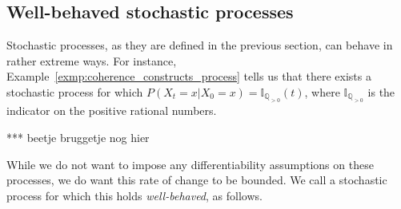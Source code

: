 \documentclass[10pt,a4paper]{paper}
\theoremstyle{definition}
\newtheorem{proposition}[theorem]{Proposition}
\newcommand{\reals}{\mathbb{R}}
\newcommand{\realsnonneg}{\reals_{\geq 0}}
\newcommand{\states}{\mathcal{X}}
\newcommand{\paths}{\Omega}
\newcommand{\power}{\mathcal{P}(\paths)}
\newcommand{\nonemptypower}{\power_{\emptyset}}
\newcommand{\processes}{\mathbb{P}}
\newcommand{\ind}[1]{\mathbb{I}_{#1}}
\newcommand{\coloneqq}{:\!=}
\begin{document}
%
%
%

\subsection{Well-behaved stochastic processes}\label{sec:well_behaved}

Stochastic processes, as they are defined in the previous section, can behave in rather extreme ways. For instance, Example~\ref{exmp:coherence_constructs_process} tells us that there exists a stochastic process for which $P(X_t=x\vert X_0=x)=\ind{\mathbb{Q}_{>0}}(t)$, where $\ind{\mathbb{Q}_{>0}}$ is the indicator on the positive rational numbers. 

*** beetje bruggetje nog hier

While we do not want to impose any differentiability assumptions on these processes, we do want this rate of change to be bounded. We call a stochastic process for which this holds \emph{well-behaved}, as follows.
\end{document}
